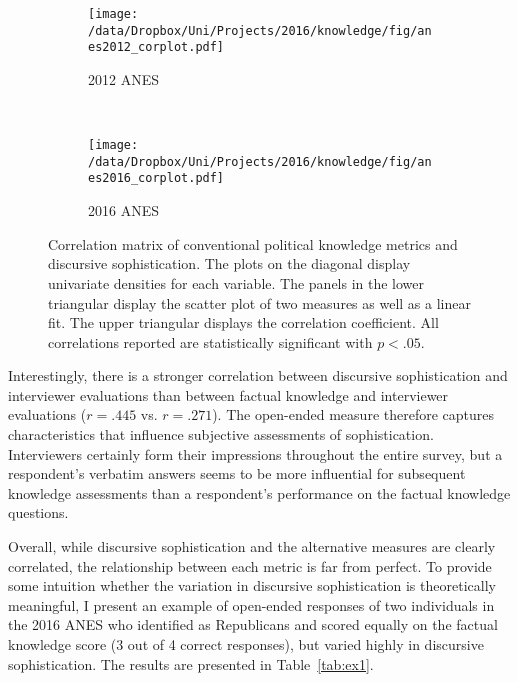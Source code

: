 \begin{figure*}[h]
    \centering
    \begin{subfigure}[t]{0.5\textwidth}
        \centering
        \texttt{[image: /data/Dropbox/Uni/Projects/2016/knowledge/fig/anes2012\_corplot.pdf]}
        \caption{2012 ANES}
    \end{subfigure}%
    ~ 
    \begin{subfigure}[t]{0.5\textwidth}
        \centering
        \texttt{[image: /data/Dropbox/Uni/Projects/2016/knowledge/fig/anes2016\_corplot.pdf]}
        \caption{2016 ANES}
    \end{subfigure}
    \caption{Correlation matrix of conventional political knowledge metrics and discursive sophistication. The plots on the diagonal display univariate densities for each variable. The panels in the lower triangular display the scatter plot of two measures as well as a linear fit. The upper triangular displays the correlation coefficient. All correlations reported are statistically significant with $p<.05$.}\label{fig:corplot}
\end{figure*}

Interestingly, there is a stronger correlation between discursive sophistication and interviewer evaluations than between factual knowledge and interviewer evaluations ($r=.445$ vs. $r=.271$). The open-ended measure therefore captures characteristics that influence subjective assessments of sophistication. Interviewers certainly form their impressions throughout the entire survey, but a respondent's verbatim answers seems to be more influential for subsequent knowledge assessments than a respondent's performance on the factual knowledge questions.

Overall, while discursive sophistication and the alternative measures are clearly correlated, the relationship between each metric is far from perfect. To provide some intuition whether the variation in discursive sophistication is theoretically meaningful, I present an example of open-ended responses of two individuals in the 2016 ANES who identified as Republicans and scored equally on the factual knowledge score (3 out of 4 correct responses), but varied highly in discursive sophistication. The results are presented in Table~\ref{tab:ex1}.

